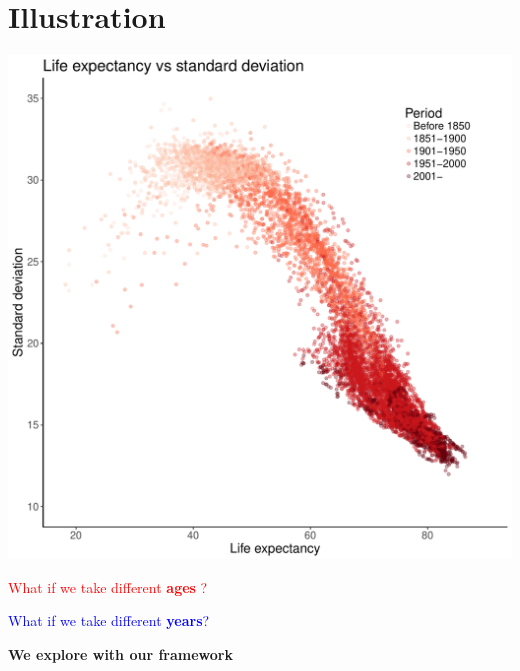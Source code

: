 \documentclass[xcolor={dvipsnames}]{beamer}
\begin{document}
\section{Illustration}
\begin{frame}
		
			\begin{center}
		\includegraphics[scale=.4]{Figures/ex_sd}
				\end{center}
			
\end{frame}

\begin{frame}
\begin{center}

		\LARGE{
\textcolor{red}{ What if we take different  \textbf{ages} ? }
\linebreak
\pause
 
\textcolor{blue}{ What if we take different   \textbf{years}? }
\linebreak
\pause


\textbf{We explore with our framework}}

\end{center}			
\end{frame}
\end{document}
